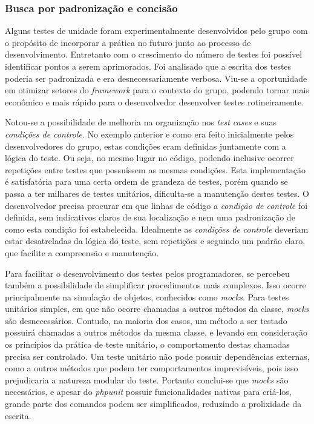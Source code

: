 \hypertarget{busca-por-padronizacao-e-concisao}{%
\subsubsection{Busca por padronização e concisão}\label{busca-por-padronizacao-e-concisao}}

Alguns testes de unidade foram experimentalmente desenvolvidos pelo grupo com o propósito de incorporar a prática no futuro junto ao processo de desenvolvimento. Entretanto com o crescimento do número de testes foi possível identificar pontos a serem aprimorados. Foi analisado que a escrita dos testes poderia ser padronizada e era desnecessariamente verbosa. Viu-se a oportunidade em otimizar setores do \emph{framework} para o contexto do grupo, podendo tornar mais econômico e mais rápido para o desenvolvedor desenvolver testes rotineiramente.

Notou-se a possibilidade de melhoria na organização nos \emph{test cases} e suas \emph{condições de controle}. No exemplo anterior e como era feito inicialmente pelos desenvolvedores do grupo, estas condições eram definidas juntamente com a lógica do teste. Ou seja, no mesmo lugar no código, podendo inclusive ocorrer repetições entre testes que possuíssem as mesmas condições. Esta implementação é satisfatória para uma certa ordem de grandeza de testes, porém quando se passa a ter milhares de testes unitários, dificulta-se a manutenção destes testes. O desenvolvedor precisa procurar em que linhas de código a \emph{condição de controle} foi definida, sem indicativos claros de sua localização e nem uma padronização de como esta condição foi estabelecida. Idealmente as \emph{condições de controle} deveriam estar desatreladas da lógica do teste, sem repetições e seguindo um padrão claro, que facilite a compreensão e manutenção.

Para facilitar o desenvolvimento dos testes pelos programadores, se percebeu também a possibilidade de simplificar procedimentos mais complexos. Isso ocorre principalmente na simulação de objetos, conhecidos como \emph{mocks}. Para testes unitários simples, em que não ocorre chamadas a outros métodos da classe, \emph{mocks} são desnecessários. Contudo, na maioria dos casos, um método a ser testado possuirá chamadas a outros métodos da mesma classe, e levando em consideração os princípios da prática de teste unitário, o comportamento destas chamadas precisa ser controlado. Um teste unitário não pode possuir dependências externas, como a outros métodos que podem ter comportamentos imprevisíveis, pois isso prejudicaria a natureza modular do teste. Portanto conclui-se que \emph{mocks} são necessários, e apesar do \emph{phpunit} possuir funcionalidades nativas para criá-los, grande parte dos comandos podem ser simplificados, reduzindo a prolixidade da escrita.

